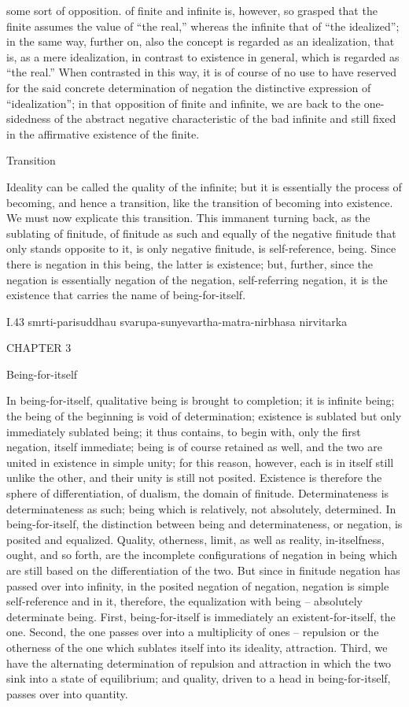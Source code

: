 some sort of opposition.
of finite and infinite is, however, so grasped that the finite assumes the value
of “the real,” whereas the infinite that of “the idealized”; in the same way,
further on, also the concept is regarded as an idealization, that is, as a mere
idealization, in contrast to existence in general, which is regarded as “the
real.” When contrasted in this way, it is of course of no use to have reserved
for the said concrete determination of negation the distinctive expression
of “idealization”; in that opposition of finite and infinite, we are back to
the one-sidedness of the abstract negative characteristic of the bad infinite
and still fixed in the affirmative existence of the finite.

Transition

Ideality can be called the quality of the infinite;
but it is essentially the process of becoming,
and hence a transition, like the transition
of becoming into existence.
We must now explicate this transition.
This immanent turning back, as the sublating of finitude,
of finitude as such and equally of the negative finitude that
only stands opposite to it, is only negative finitude,
is self-reference, being.
Since there is negation in this being, the latter is existence;
but, further, since the negation is essentially
negation of the negation, self-referring negation,
it is the existence that carries the name of being-for-itself.

I.43
smrti-parisuddhau svarupa-sunyevartha-matra-nirbhasa nirvitarka

CHAPTER 3

Being-for-itself

In being-for-itself, qualitative being is brought to completion;
it is infinite being;
the being of the beginning is void of determination;
existence is sublated but only immediately sublated being;
it thus contains, to begin with, only the first negation, itself immediate;
being is of course retained as well,
and the two are united in existence in simple unity;
for this reason, however, each is in itself still unlike the other,
and their unity is still not posited.
Existence is therefore the sphere of differentiation,
of dualism, the domain of finitude.
Determinateness is determinateness as such;
being which is relatively, not absolutely, determined.
In being-for-itself, the distinction between being and determinateness,
or negation, is posited and equalized.
Quality, otherness, limit, as well as reality, in-itselfness,
ought, and so forth, are the incomplete configurations of negation in being
which are still based on the differentiation of the two.
But since in finitude
negation has passed over into infinity, in the posited negation of negation,
negation is simple self-reference and in it, therefore, the equalization with
being – absolutely determinate being.
First, being-for-itself is immediately an existent-for-itself, the one.
Second, the one passes over into a multiplicity of ones – repulsion or the
otherness of the one which sublates itself into its ideality, attraction.
Third, we have the alternating determination of repulsion and attraction
in which the two sink into a state of equilibrium; and quality, driven to a
head in being-for-itself, passes over into quantity.

